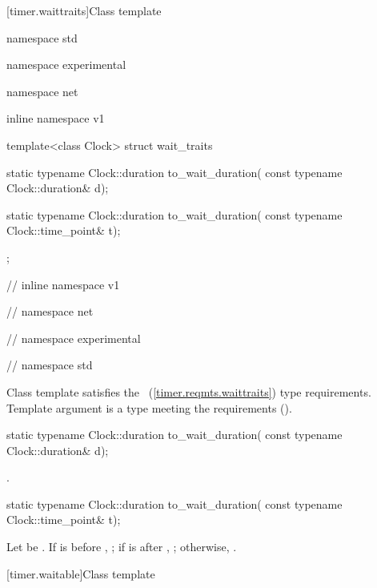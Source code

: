 [timer.waittraits]{Class template }

%
\begin{codeblock}
namespace std {
namespace experimental {
namespace net {
inline namespace v1 {

  template<class Clock>
  struct wait_traits
  {
    static typename Clock::duration to_wait_duration(
      const typename Clock::duration& d);

    static typename Clock::duration to_wait_duration(
      const typename Clock::time_point& t);
  };

} // inline namespace v1
} // namespace net
} // namespace experimental
} // namespace std
\end{codeblock}

\pnum
Class template  satisfies the ~(\ref{timer.reqmts.waittraits}) type requirements. Template argument  is a type meeting the  requirements ().

%
\begin{itemdecl}
static typename Clock::duration to_wait_duration(
  const typename Clock::duration& d);
\end{itemdecl}

\begin{itemdescr}
\pnum
\returns {}.
\end{itemdescr}

%
\begin{itemdecl}
static typename Clock::duration to_wait_duration(
  const typename Clock::time_point& t);
\end{itemdecl}

\begin{itemdescr}
\pnum
\returns Let  be . If  is before , ; if  is after , ; otherwise, .
\end{itemdescr}


[timer.waitable]{Class template }

